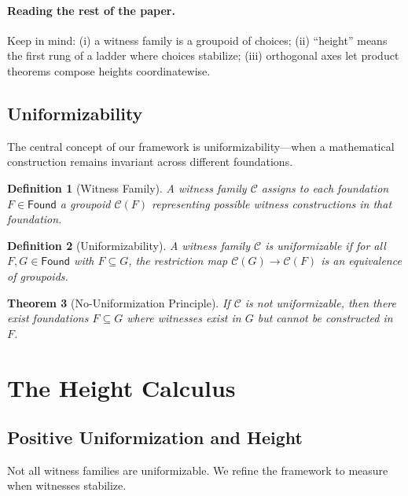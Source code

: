 \documentclass[11pt]{article}
\newtheorem{theorem}{Theorem}[section]
\newtheorem{definition}[theorem]{Definition}
\newcommand{\Found}{\mathsf{Found}}
\begin{document}
\paragraph{Reading the rest of the paper.}
Keep in mind: (i) a witness family is a groupoid of choices; (ii) ``height'' means the first rung of a ladder where choices stabilize; (iii) orthogonal axes let product theorems compose heights coordinatewise.

\subsection{Uniformizability}

The central concept of our framework is uniformizability—when a mathematical construction remains invariant across different foundations.

\begin{definition}[Witness Family]
A \emph{witness family} $\mathcal{C}$ assigns to each foundation $F \in \Found$ a groupoid $\mathcal{C}(F)$ representing possible witness constructions in that foundation.
\end{definition}

\begin{definition}[Uniformizability]
A witness family $\mathcal{C}$ is \emph{uniformizable} if for all $F, G \in \Found$ with $F \subseteq G$, the restriction map $\mathcal{C}(G) \to \mathcal{C}(F)$ is an equivalence of groupoids.
\end{definition}

\begin{theorem}[No-Uniformization Principle]\label{thm:no-unif}
If $\mathcal{C}$ is not uniformizable, then there exist foundations $F \subseteq G$ where witnesses exist in $G$ but cannot be constructed in $F$.
\end{theorem}

\section{The Height Calculus}

\subsection{Positive Uniformization and Height}

Not all witness families are uniformizable. We refine the framework to measure when witnesses stabilize.
\end{document}
